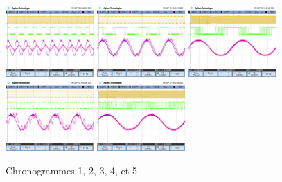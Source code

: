 \documentclass[11pt, openright]{book}
\begin{document}
\begin{figure}[ht!]
    \centering
    \includegraphics[width=0.3\textwidth]{./object/g11.png}
    \hspace{0.05\textwidth}
    \includegraphics[width=0.3\textwidth]{./object/g12.png}
    \hspace{0.05\textwidth}
    \includegraphics[width=0.3\textwidth]{./object/g13.png}
    \hspace{0.05\textwidth}
    \includegraphics[width=0.3\textwidth]{./object/g14.png}
    \hspace{0.05\textwidth}
    \includegraphics[width=0.3\textwidth]{./object/g15.png}
    \caption{Chronogrammes 1, 2, 3, 4, et 5}
\end{figure}

\newpage
\end{document}
